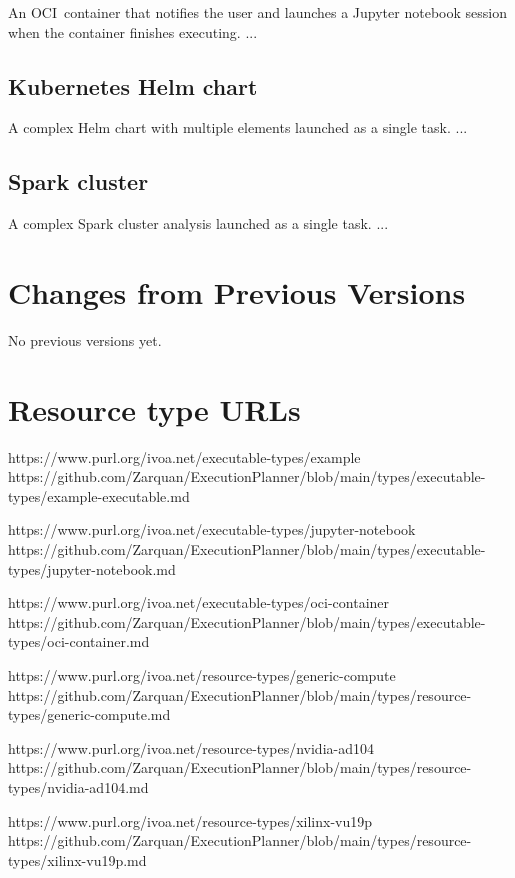 \documentclass[11pt,a4paper]{ivoa}
\newcommand{\jupyternotebook} {Jupyter notebook}
\newcommand{\ocicontainer} {OCI~container}
\begin{document}
An \ocicontainer{} that notifies the user and launches a \jupyternotebook{} session
when the container finishes executing.
...

\subsection{Kubernetes Helm chart}
\label{kubernetes-helm}

A complex Helm chart with multiple elements launched as a single task.
...

\subsection{Spark cluster}
\label{spark-cluster}

A complex Spark cluster analysis launched as a single task.
...

\pagebreak
\appendix
\section{Changes from Previous Versions}

No previous versions yet.

\pagebreak
\appendix
\section{Resource type URLs}


https://www.purl.org/ivoa.net/executable-types/example
https://github.com/Zarquan/ExecutionPlanner/blob/main/types/executable-types/example-executable.md

https://www.purl.org/ivoa.net/executable-types/jupyter-notebook
https://github.com/Zarquan/ExecutionPlanner/blob/main/types/executable-types/jupyter-notebook.md

https://www.purl.org/ivoa.net/executable-types/oci-container
https://github.com/Zarquan/ExecutionPlanner/blob/main/types/executable-types/oci-container.md

https://www.purl.org/ivoa.net/resource-types/generic-compute
https://github.com/Zarquan/ExecutionPlanner/blob/main/types/resource-types/generic-compute.md

https://www.purl.org/ivoa.net/resource-types/nvidia-ad104
https://github.com/Zarquan/ExecutionPlanner/blob/main/types/resource-types/nvidia-ad104.md

https://www.purl.org/ivoa.net/resource-types/xilinx-vu19p
https://github.com/Zarquan/ExecutionPlanner/blob/main/types/resource-types/xilinx-vu19p.md
\end{document}
